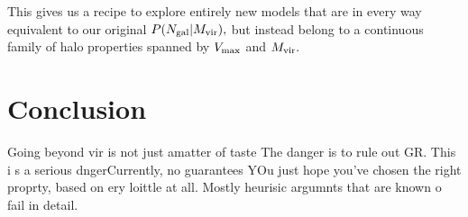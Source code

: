 \documentclass[usenatbib,usegraphicx,letterpaper]{mn2e}
\newcommand{\Ngal}{N_{\rm gal}}
\newcommand{\vmax}{V_{\rm max}}
\newcommand{\mvir}{M_{\rm vir}}
\begin{document}
This gives us a recipe to explore entirely new models that are in every way equivalent to our original $P(\Ngal | \mvir),$ but instead belong to a continuous family of halo properties spanned by $\vmax$ and $\mvir.$

\section{Conclusion}

Going beyond vir is not just  amatter of taste The danger is to rule out GR. This i s a serious dngerCurrently, no guarantees YOu just hope you've chosen the right proprty, based on ery loittle at all. Mostly heurisic argumnts that are known o fail in detail. 



\end{document}
